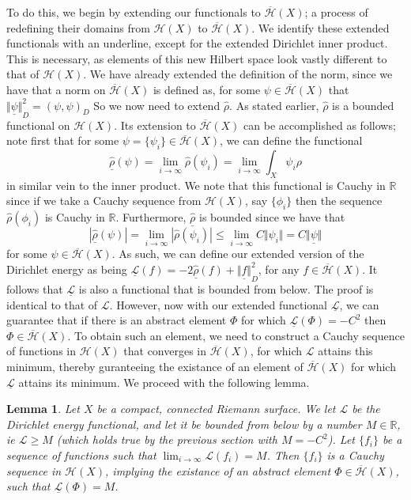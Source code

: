 \documentclass[11pt]{report}
\newtheorem{lemma}[thm]{Lemma}
\theoremstyle{definition}
\begin{document}
To do this, we begin by extending our functionals to $\overline{\mathcal{H}}(X)$; a process of redefining their domains from $\mathcal{H}(X)$ to $\overline{\mathcal{H}}(X)$. We identify these extended functionals with an underline, except for the extended Dirichlet inner product. This is necessary, as elements of this new Hilbert space look vastly different to that of $\mathcal{H}(X)$. We have already extended the definition of the norm, since we have that a norm on $\overline{\mathcal{H}}(X)$ is defined as, for some $\psi \in \overline{\mathcal{H}}(X)$ that $\underline{\Vert\psi\Vert}_D^2 = (\psi, \psi)_D$
So we now need to extend $\hat{\rho}$. As stated earlier, $\hat{\rho}$ is a bounded functional on $\mathcal{H}(X)$. Its extension to $\overline{\mathcal{H}}(X)$ can be accomplished as follows; note first that for some $\psi = \{\psi_i\} \in \overline{\mathcal{H}}(X)$, we can define the functional 
\[\underline{\hat{\rho}}(\psi) = \lim_{i \rightarrow \infty} \hat{\rho}(\psi_i) = \lim_{i \rightarrow \infty} \int_X \psi_i\rho\]
in similar vein to the inner product. We note that this functional is Cauchy in $\mathbb{R}$ since if we take a Cauchy sequence from $\mathcal{H}(X)$, say $\{\phi_i\}$ then the sequence $\hat{\rho}(\phi_i)$ is Cauchy in $\mathbb{R}$.
Furthermore, $\underline{\hat{\rho}}$ is bounded since we have that 
\[ |\underline{\hat{\rho}}(\psi)| = \lim_{i \rightarrow \infty}|\hat{\rho}(\psi_i)| \leq \lim_{i \rightarrow \infty}C\Vert \psi_i \Vert = C\underline{\Vert \psi\Vert} \] for some $\psi \in \overline{\mathcal{H}}(X)$.
As such, we can define our extended version of the Dirichlet energy as being
$\underline{\mathcal{L}}(f) =  -2\underline{\hat{\rho}}(f) + \underline{\Vert f \Vert}_D^2$, for any $f \in \overline{\mathcal{H}}(X)$. It follows that $\underline{\mathcal{L}}$ is also a functional that is bounded from below. The proof is identical to that of $\mathcal{L}$. However, now with our extended functional $\underline{\mathcal{L}}$, we can guarantee that if there is an abstract element $\Phi$ for which $\underline{\mathcal{L}}(\Phi) = -C^2$ then $\Phi \in \overline{\mathcal{H}}(X)$. To obtain such an element, we need to construct a Cauchy sequence of functions in $\mathcal{H}(X)$ that converges in $\overline{\mathcal{H}}(X)$, for which $\mathcal{L}$ attains this minimum, thereby guranteeing the existance of an element of $\overline{\mathcal{H}}(X)$ for which $\underline{\mathcal{L}}$ attains its minimum. We proceed with the following lemma.
\begin{lemma}
  Let $X$ be a compact, connected Riemann surface. We let $\mathcal{L}$ be the Dirichlet energy functional, and let it be bounded from below by a number $M \in \mathbb{R}$, ie $\mathcal{L} \geq M$ (which holds true by the previous section with $M=-C^2$).
  Let $\{f_i\}$ be a sequence of functions such that $\lim_{i \rightarrow \infty}\mathcal{L}(f_i) = M$. Then $\{f_i\}$ is a Cauchy sequence in $\mathcal{H}(X)$, implying the existance of an abstract element $\Phi \in \overline{\mathcal{H}}(X)$, such that $\underline{\mathcal{L}}(\Phi) = M$.
\end{lemma}
\end{document}
